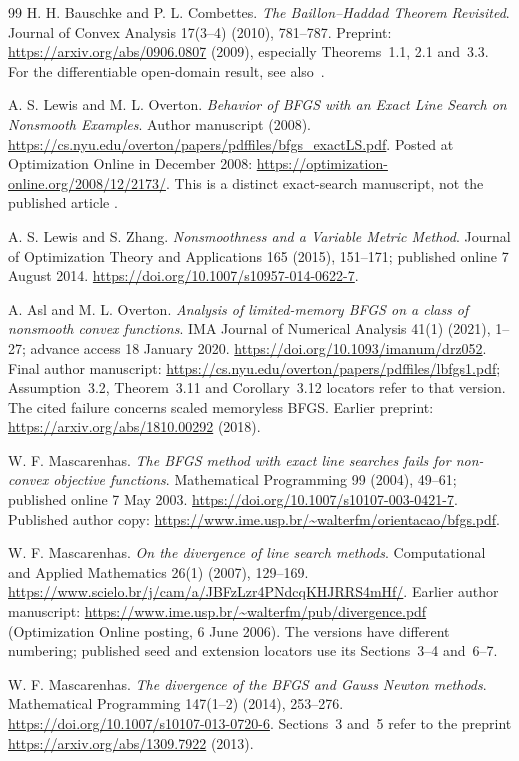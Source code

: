 \begin{thebibliography}{99}
H. H. Bauschke and P. L. Combettes. \emph{The Baillon--Haddad Theorem Revisited}. Journal of Convex Analysis 17(3--4) (2010), 781--787. Preprint: \url{https://arxiv.org/abs/0906.0807} (2009), especially Theorems~1.1, 2.1 and~3.3. For the differentiable open-domain result, see also~\cite{WW}.

A. S. Lewis and M. L. Overton. \emph{Behavior of BFGS with an Exact Line Search on Nonsmooth Examples}. Author manuscript (2008). \url{https://cs.nyu.edu/overton/papers/pdffiles/bfgs_exactLS.pdf}. Posted at Optimization Online in December 2008: \url{https://optimization-online.org/2008/12/2173/}. This is a distinct exact-search manuscript, not the published article \cite{LO}.

A. S. Lewis and S. Zhang. \emph{Nonsmoothness and a Variable Metric Method}. Journal of Optimization Theory and Applications 165 (2015), 151--171; published online 7 August 2014. \url{https://doi.org/10.1007/s10957-014-0622-7}.

A. Asl and M. L. Overton. \emph{Analysis of limited-memory BFGS on a class of nonsmooth convex functions}. IMA Journal of Numerical Analysis 41(1) (2021), 1--27; advance access 18 January 2020. \url{https://doi.org/10.1093/imanum/drz052}. Final author manuscript: \url{https://cs.nyu.edu/overton/papers/pdffiles/lbfgs1.pdf}; Assumption~3.2, Theorem~3.11 and Corollary~3.12 locators refer to that version. The cited failure concerns scaled memoryless BFGS. Earlier preprint: \url{https://arxiv.org/abs/1810.00292} (2018).

W. F. Mascarenhas. \emph{The BFGS method with exact line searches fails for non-convex objective functions}. Mathematical Programming 99 (2004), 49--61; published online 7 May 2003. \url{https://doi.org/10.1007/s10107-003-0421-7}. Published author copy: \url{https://www.ime.usp.br/~walterfm/orientacao/bfgs.pdf}.

W. F. Mascarenhas. \emph{On the divergence of line search methods}. Computational and Applied Mathematics 26(1) (2007), 129--169. \url{https://www.scielo.br/j/cam/a/JBFzLzr4PNdcqKHJRRS4mHf/}. Earlier author manuscript: \url{https://www.ime.usp.br/~walterfm/pub/divergence.pdf} (Optimization Online posting, 6 June 2006). The versions have different numbering; published seed and extension locators use its Sections~3--4 and~6--7.

W. F. Mascarenhas. \emph{The divergence of the BFGS and Gauss Newton methods}. Mathematical Programming 147(1--2) (2014), 253--276. \url{https://doi.org/10.1007/s10107-013-0720-6}. Sections~3 and~5 refer to the preprint \url{https://arxiv.org/abs/1309.7922} (2013).


\end{thebibliography}
